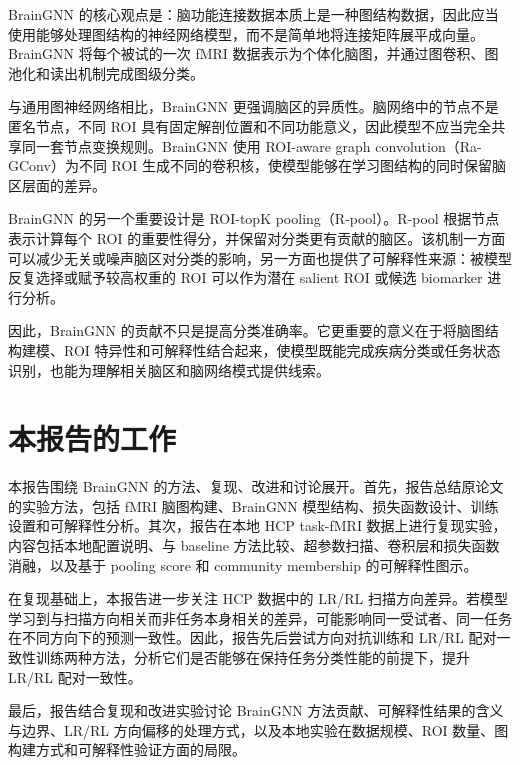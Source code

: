 BrainGNN 的核心观点是：脑功能连接数据本质上是一种图结构数据，因此应当使用能够处理图结构的神经网络模型，而不是简单地将连接矩阵展平成向量。BrainGNN 将每个被试的一次 fMRI 数据表示为个体化脑图，并通过图卷积、图池化和读出机制完成图级分类。

与通用图神经网络相比，BrainGNN 更强调脑区的异质性。脑网络中的节点不是匿名节点，不同 ROI 具有固定解剖位置和不同功能意义，因此模型不应当完全共享同一套节点变换规则。BrainGNN 使用 ROI-aware graph convolution（Ra-GConv）为不同 ROI 生成不同的卷积核，使模型能够在学习图结构的同时保留脑区层面的差异。

BrainGNN 的另一个重要设计是 ROI-topK pooling（R-pool）。R-pool 根据节点表示计算每个 ROI 的重要性得分，并保留对分类更有贡献的脑区。该机制一方面可以减少无关或噪声脑区对分类的影响，另一方面也提供了可解释性来源：被模型反复选择或赋予较高权重的 ROI 可以作为潜在 salient ROI 或候选 biomarker 进行分析。

因此，BrainGNN 的贡献不只是提高分类准确率。它更重要的意义在于将脑图结构建模、ROI 特异性和可解释性结合起来，使模型既能完成疾病分类或任务状态识别，也能为理解相关脑区和脑网络模式提供线索。

\section{本报告的工作}

本报告围绕 BrainGNN 的方法、复现、改进和讨论展开。首先，报告总结原论文的实验方法，包括 fMRI 脑图构建、BrainGNN 模型结构、损失函数设计、训练设置和可解释性分析。其次，报告在本地 HCP task-fMRI 数据上进行复现实验，内容包括本地配置说明、与 baseline 方法比较、超参数扫描、卷积层和损失函数消融，以及基于 pooling score 和 community membership 的可解释性图示。

在复现基础上，本报告进一步关注 HCP 数据中的 LR/RL 扫描方向差异。若模型学习到与扫描方向相关而非任务本身相关的差异，可能影响同一受试者、同一任务在不同方向下的预测一致性。因此，报告先后尝试方向对抗训练和 LR/RL 配对一致性训练两种方法，分析它们是否能够在保持任务分类性能的前提下，提升 LR/RL 配对一致性。

最后，报告结合复现和改进实验讨论 BrainGNN 方法贡献、可解释性结果的含义与边界、LR/RL 方向偏移的处理方式，以及本地实验在数据规模、ROI 数量、图构建方式和可解释性验证方面的局限。
